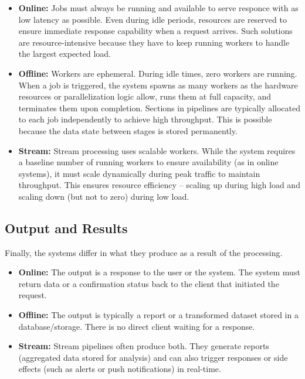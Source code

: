 \begin{itemize}
    \item \textbf{Online:} Jobs must always be running and available to serve responce with as low latency as possible. Even during idle periods, resources are reserved to ensure immediate response capability when a request arrives. Such solutions are resource-intensive because they have to keep running workers to handle the largest expected load.
    \item \textbf{Offline:} Workers are ephemeral. During idle times, zero workers are running. When a job is triggered, the system spawns as many workers as the hardware resources or parallelization logic allow, runs them at full capacity, and terminates them upon completion. Sections in pipelines are typically allocated to each job independently to achieve high throughput. This is possible because the data state between stages is stored permanently.
    \item \textbf{Stream:} Stream processing uses scalable workers. While the system requires a baseline number of running workers to ensure availability (as in online systems), it must scale dynamically during peak traffic to maintain throughput. This ensures resource efficiency -- scaling up during high load and scaling down (but not to zero) during low load.
\end{itemize}

\subsection{Output and Results}
Finally, the systems differ in what they produce as a result of the processing.

\begin{itemize}
    \item \textbf{Online:} The output is a response to the user or the system. The system must return data or a confirmation status back to the client that initiated the request.
    \item \textbf{Offline:} The output is typically a report or a transformed dataset stored in a database/storage. There is no direct client waiting for a response.
    \item \textbf{Stream:} Stream pipelines often produce both. They generate reports (aggregated data stored for analysis) and can also trigger responses or side effects (such as alerts or push notifications) in real-time.
    
\cite{kleppmann_designing_2017}
\end{itemize}

